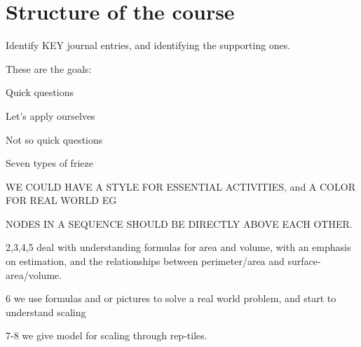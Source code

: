 \documentclass[handout,nooutcomes,noauthor]{ximera}
\begin{document}
\section*{Structure of the course}





Identify KEY journal entries, and identifying the supporting ones. 


These are the goals: 

Quick questions

Let's apply ourselves

Not so quick questions

Seven types of frieze








WE COULD HAVE A STYLE FOR ESSENTIAL ACTIVITIES, and  A COLOR FOR REAL WORLD EG

NODES IN A SEQUENCE SHOULD BE DIRECTLY ABOVE EACH OTHER.


2,3,4,5 deal with understanding formulas for area and volume, with an
emphasis on estimation, and the relationships between perimeter/area
and surface-area/volume.


6 we use formulas and or pictures to solve a real world problem, and
start to understand scaling

7-8 we give model for scaling through rep-tiles. 
\end{document}
